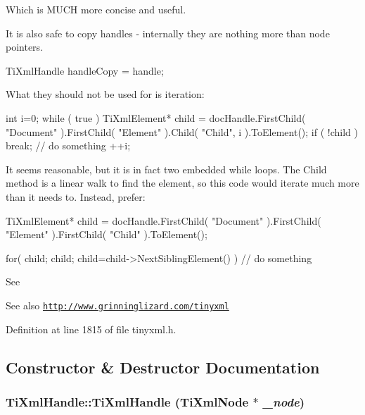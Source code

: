 Which is MUCH more concise and useful.

It is also safe to copy handles -\/ internally they are nothing more than node pointers. \begin{DoxyVerb}
   TiXmlHandle handleCopy = handle;
   \end{DoxyVerb}


What they should not be used for is iteration:

\begin{DoxyVerb}
   int i=0;
   while ( true )
   {
   TiXmlElement* child = docHandle.FirstChild( "Document" ).FirstChild( "Element" ).Child( "Child", i ).ToElement();
   if ( !child )
   break;
   // do something
   ++i;
   }
   \end{DoxyVerb}


It seems reasonable, but it is in fact two embedded while loops. The Child method is a linear walk to find the element, so this code would iterate much more than it needs to. Instead, prefer:

\begin{DoxyVerb}
   TiXmlElement* child = docHandle.FirstChild( "Document" ).FirstChild( "Element" ).FirstChild( "Child" ).ToElement();

   for( child; child; child=child->NextSiblingElement() )
   {
   // do something
   }
   \end{DoxyVerb}


See \begin{DoxySeeAlso}{See also}
\href{http://www.grinninglizard.com/tinyxml}{\tt http://www.grinninglizard.com/tinyxml} 
\end{DoxySeeAlso}


Definition at line 1815 of file tinyxml.h.

\subsection{Constructor \& Destructor Documentation}
\hypertarget{class_ti_xml_handle_aba18fd7bdefb942ecdea4bf4b8e29ec8}{
\subsubsection[{TiXmlHandle}]{\setlength{\rightskip}{0pt plus 5cm}TiXmlHandle::TiXmlHandle ({\bf TiXmlNode} $\ast$ {\em \_\-node})}}
\label{class_ti_xml_handle_aba18fd7bdefb942ecdea4bf4b8e29ec8}


